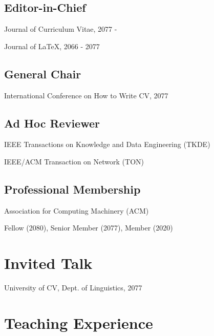 \documentclass{article}
\begin{document}
\subsection*{\hspace{1em}Editor-in-Chief}
\indent

Journal of Curriculum Vitae, 2077 -

Journal of \LaTeX, 2066 - 2077

\subsection*{\hspace{1em}General Chair}
\indent

International Conference on How to Write CV, 2077

\subsection*{\hspace{1em}Ad Hoc Reviewer}
\indent

IEEE Transactions on Knowledge and Data Engineering (TKDE)

IEEE/ACM Transaction on Network (TON)

\subsection*{\hspace{1em}Professional Membership}
\indent

Association for Computing Machinery (ACM)

\hspace{2em}Fellow (2080), Senior Member (2077), Member (2020)









\section*{Invited Talk}
\indent 

University of CV, Dept. of Linguistics, 2077 



\section*{Teaching Experience}
\indent
\end{document}
